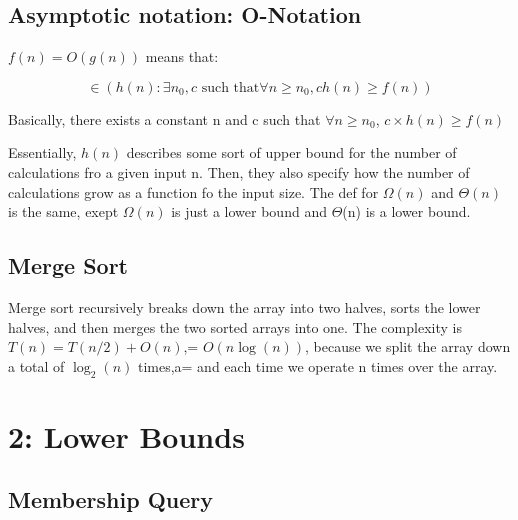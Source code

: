 \documentclass[portrait,10pt,a4paper]{article}
\begin{document}
\begin{multicols*}{3}
\subsection{Asymptotic notation: O-Notation}
$f(n) = O(g(n))$ means that: 

		\[ \in (h(n) : \exists n_{0},c \text{ such that}
		\forall n\geq n_{0}, ch(n)\geq f(n))\]

Basically, there exists a constant n and c such that $\forall n\geq n_{0}$,
$c \times h(n)\geq f(n)$

Essentially, $h(n)$ describes some sort of upper bound for the number of calculations fro a given input n.
Then, they also specify how the number of calculations grow as a function fo the input size. The def 
for $\Omega(n)$ and $\Theta(n)$ is the same, exept $\Omega(n)$ is just a lower bound and $\Theta$(n) is 
a lower bound.
\subsection{Merge Sort}
Merge sort recursively breaks down the array into two halves, sorts the lower halves, and then merges the two 
sorted arrays into one. The complexity is $T(n) = T(n/2) + O(n)$,= $O(n \log(n))$, because we split
the array down a total of $\log_{2}(n)$ times,a= and each time we operate n times over the array.

\section{2: Lower Bounds}
\subsection{Membership Query}
\end{multicols*}
\end{document}
